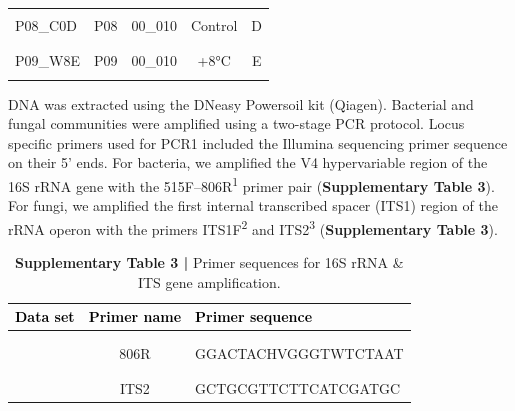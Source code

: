 \documentclass[
  10pt,
  letterpaper,
  DIV=11,
  numbers=noendperiod]{scrartcl}
\begin{document}
\begin{table}[H]
\begin{tabular}[t]{lcccc}
\hspace{1em}\cellcolor{gray!6}{P07\_W8D} & \cellcolor{gray!6}{P07} & \cellcolor{gray!6}{00\_010} & \cellcolor{gray!6}{+8°C} & \cellcolor{gray!6}{D}\\
\hspace{1em}P08\_C0D & P08 & 00\_010 & Control & D\\
\addlinespace[-0.4em]
\multicolumn{5}{l}{\textbf{}}\\
\hspace{1em}\cellcolor{gray!6}{P09\_W3E} & \cellcolor{gray!6}{P09} & \cellcolor{gray!6}{00\_010} & \cellcolor{gray!6}{+3°C} & \cellcolor{gray!6}{E}\\
\hspace{1em}P09\_W8E & P09 & 00\_010 & +8°C & E\\
\hspace{1em}\cellcolor{gray!6}{P10\_C0E} & \cellcolor{gray!6}{P10} & \cellcolor{gray!6}{00\_010} & \cellcolor{gray!6}{Control} & \cellcolor{gray!6}{E}\\
\bottomrule
\end{tabular}
\end{table}

DNA was extracted using the DNeasy Powersoil kit (Qiagen). Bacterial and
fungal communities were amplified using a two-stage PCR protocol. Locus
specific primers used for PCR1 included the Illumina sequencing primer
sequence on their 5' ends. For bacteria, we amplified the V4
hypervariable region of the 16S rRNA gene with the
515F--806R\textsuperscript{1} primer pair (\textbf{Supplementary Table
3}). For fungi, we amplified the first internal transcribed spacer
(ITS1) region of the rRNA operon with the primers
ITS1F\textsuperscript{2} and ITS2\textsuperscript{3}
(\textbf{Supplementary Table 3}).

\begin{table}[H]

\caption{\textbf{Supplementary Table 3 |} Primer sequences for 16S rRNA \& ITS gene amplification.}
\centering
\fontsize{8}{10}\selectfont
\begin{tabular}[t]{lcl}
\toprule
\textcolor{black}{\textbf{Data set}} & \textcolor{black}{\textbf{Primer name}} & \textcolor{black}{\textbf{Primer sequence}}\\
\midrule
\addlinespace[1em]
\multicolumn{3}{l}{\textbf{16S rRNA}}\\
\hspace{1em}\cellcolor{gray!6}{} & \cellcolor{gray!6}{515F} & \cellcolor{gray!6}{GTGCCAGCMGCCGCGGTAA}\\
\hspace{1em} & 806R & GGACTACHVGGGTWTCTAAT\\
\addlinespace[0.3em]
\multicolumn{3}{l}{\textbf{ITS}}\\
\hspace{1em}\cellcolor{gray!6}{} & \cellcolor{gray!6}{ITS1f} & \cellcolor{gray!6}{CTTGGTCATTTAGAGGAAGTAA}\\
\hspace{1em} & ITS2 & GCTGCGTTCTTCATCGATGC\\
\bottomrule
\end{tabular}
\end{table}
\end{document}
